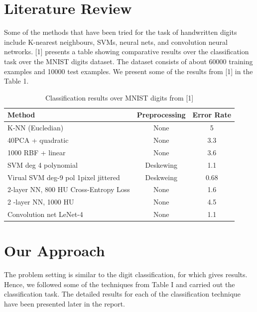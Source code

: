 \documentclass[conference]{IEEEtran}
\begin{document}
\section{Literature Review}

Some of the methods that have been tried for the task of handwritten digits include K-nearest neighbours, SVMs, neural nets, and convolution neural networks. [1] presents a table showing comparative results over the classification task over the MNIST digits dataset. The dataset consists of about 60000 training examples and 10000 test examples. We present some of the results from [1] in the Table 1.
\newline\newline
\bgroup
\def\arraystretch{1.5}
\begin{table}[h]
\centering
\caption{Classification results over MNIST digits from [1]}
\begin{tabularx}{0.5\textwidth}{lcc}\hline\hline
Method & Preprocessing & Error Rate \\
\hline
K-NN (Eucledian) & None & 5\\
40PCA + quadratic & None & 3.3\\
1000 RBF + linear & None & 3.6 \\
SVM deg 4 polynomial & Deskewing & 1.1 \\ 
Virual SVM deg-9 pol 1pixel jittered & Deskweing & 0.68\\
2-layer NN, 800 HU Cross-Entropy Loss & None & 1.6 \\
2 -layer NN, 1000 HU & None & 4.5 \\
Convolution net LeNet-4 & None & 1.1 \\
\hline\hline
\end{tabularx}
\label{table:results}
\end{table}
\egroup

\section{Our Approach}
The problem setting is similar to the digit classification, for which \label{table:results} gives results. Hence, we followed some of the techniques from Table I and carried out the classification task. The detailed results for each of the classification technique have been presented later in the report.
\end{document}
